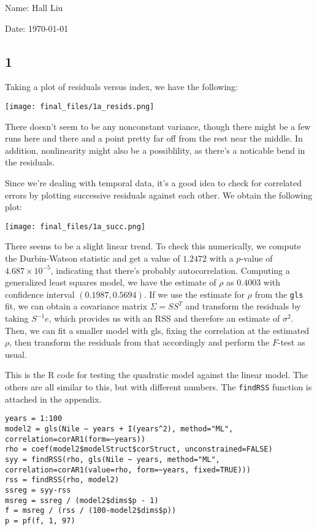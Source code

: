 \documentclass{article}
\begin{document}
Name: Hall Liu

Date: \today 
\vspace{1.5cm}
\subsection*{1}
Taking a plot of residuals versus index, we have the following:

\texttt{[image: final\_files/1a\_resids.png]}

There doesn't seem to be any nonconstant variance, though there might be a few runs here and there and a point pretty far off from the rest near the middle. In addition, nonlinearity might also be a possiblility, as there's a noticable bend in the residuals.

Since we're dealing with temporal data, it's a good idea to check for correlated errors by plotting successive residuals against each other. We obtain the following plot:

\texttt{[image: final\_files/1a\_succ.png]}

There seems to be a slight linear trend. To check this numerically, we compute the Durbin-Watson statistic and get a value of $1.2472$ with a $p$-value of $4.687\times10^{-5}$, indicating that there's probably autocorrelation.
Computing a generalized least squares model, we have the estimate of $\rho$ as $0.4003$ with confidence interval $(0.1987, 0.5694)$.
If we use the estimate for $\rho$ from the \verb|gls| fit, we can obtain a covariance matrix $\Sigma=SS^T$ and transform the residuals by taking $S^{-1}e$, which provides us with an RSS and therefore an estimate of $\sigma^2$. Then, we can fit a smaller model with gls, fixing the correlation at the estimated $\rho$, then transform the residuals from that accordingly and perform the $F$-test as usual.

This is the R code for testing the quadratic model against the linear model. The others are all similar to this, but with different numbers. The \verb|findRSS| function is attached in the appendix.

\begin{verbatim}
years = 1:100
model2 = gls(Nile ~ years + I(years^2), method="ML", correlation=corAR1(form=~years))
rho = coef(model2$modelStruct$corStruct, unconstrained=FALSE)
syy = findRSS(rho, gls(Nile ~ years, method="ML", correlation=corAR1(value=rho, form=~years, fixed=TRUE)))
rss = findRSS(rho, model2)
ssreg = syy-rss
msreg = ssreg / (model2$dims$p - 1)
f = msreg / (rss / (100-model2$dims$p))
p = pf(f, 1, 97)
\end{verbatim}
\end{document}
